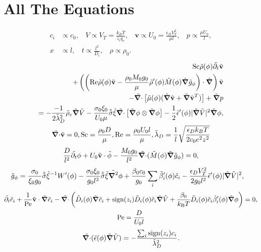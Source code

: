 \documentclass[a4paper,10pt]{article}
\renewcommand{\v}[1]{\mathbf{#1}}
\renewcommand{\v}[1]{\ensuremath{\mathbf{#1}}} %
\newcommand{\ti}[1]{\ensuremath{\tilde{#1}}} %
\newcommand{\gv}[1]{\ensuremath{\mbox{\boldmath$ #1 $}}}
\newcommand{\grad}[1]{\gv{\nabla} #1} %
\renewcommand{\div}[1]{\gv{\nabla} \cdot #1} %
\newcommand{\laplacian}[1]{\grad^2 #1}
\newcommand{\pdt}[1]{\partial_t #1}
\begin{document}
\section{All The Equations}
\begin{align}
c_i &\propto c_0, ~~~~ V \propto V_T = \frac{k_B T}{z_i q_e}, ~~~~\v{v} \propto U_0 = \frac{\epsilon_D V_T^2}{\mu l}, ~~~~p \propto \frac{\mu U_0}{l},\\
x &\propto l , ~~~~ t \propto \frac{l^2}{D_i}, ~~~~ \rho \propto \rho_0.
\end{align}
\begin{gather}
\begin{split}	
\mathrm{Sc} \ti{\rho}(\phi) \ti{\pdt{}} \ti{\v{v}}\\
+ \left( \left( \mathrm{Re} \ti\rho(\phi) \ti{\v{v}} - \frac{\rho_0 M_0 g_0}{\mu}\ti\rho'(\phi) \ti M(\phi) \ti{\grad{}} \ti g_\phi  \right) \cdot \ti{\grad{}} \right) \ti{\v{v}}\\
- \ti{\div{}} \left[\ti \mu(\phi)(\ti{\grad{}} \ti{\v{v}} + \ti{\grad{}} \ti{\v{v}} ^T) \right] + \ti{\grad{}} p \\
= - \frac{-1}{2\tilde{\lambda}_D^2} \ti \rho_e \ti{\grad{}} \ti{V} - \frac{\sigma_0 \xi_0 }{U_0 \mu}\hat{\ti{\sigma}} \ti \xi\ti{\div{}} \left[ \ti{\grad{}} \phi \otimes \ti{\grad{}} \phi \right] - \frac 1 2 \ti \epsilon'(\phi) | \ti{\grad{}} \ti V |^2 \ti{\grad{}} \phi,
\end{split}\\
\ti{\div{}} \ti{\v{v}} = 0, \mathrm{Sc} = \frac{\rho_0 D}{\mu},\mathrm{Re} = \frac{\rho_0 
	U_0 l}{\mu} ,\tilde{\lambda}_D = \frac{1}{l}\sqrt{\frac{\epsilon_D k_B T}{2 c_0 e^2 z^2}} 
\end{gather}
\begin{gather}
\frac{D}{l^2}\ti{\pdt{}} \phi + U_0\ti{\v v} \cdot \ti{\phi} - \frac{M_0 g_0 }{l^2}\ti{\div{}} (\ti{M}(\phi) \ti{\grad{}} \ti{g}_\phi ) = 0,
\end{gather}
\begin{align}
\tilde{g}_\phi &= \frac{\sigma_0}{\xi_0 g_0 }\hat{\ti{\sigma}}\ti{\xi}^{-1}W'(\phi) - \frac{\sigma_0 \xi_0}{g_0 l^2}\hat{\ti{\sigma}}\ti{\xi}\ti{\laplacian{}}\phi + \frac{\beta_0 c_0}{g_0}\sum_i \ti{\beta}_i'(\phi) \ti{c}_i - \frac{\epsilon_D V_T^2}{2 g_0 l^2} \ti{\epsilon}'(\phi) | \ti{\grad{}} \ti{V} |^2 ,
\end{align}
\begin{gather}
\ti{\pdt{}} \ti{c}_i + \frac{1}{\mathrm{Pe}}\ti{\v{v}} \cdot \ti{\grad{}} \ti{c}_i - \ti{\div{}} \left( \ti{D}_{i} (\phi) \ti{\grad{}} \ti{c}_i + \mathrm{sign}(z_i)\ti{D}_i(\phi)\ti{c}_i \ti{\grad{}} \ti{V} +\frac{ \beta_0}{k_{\rm B} T }\ti{D}_i(\phi)\ti{c}_i\ti{\beta}_i'(\phi) \ti{\grad{}} \phi \right) = 0,\\ 
\mathrm{Pe} = \frac{D}{U_0 l }
\end{gather}
\begin{gather}
\ti{\div{}} ( \ti{\epsilon} (\phi) \ti{\grad{}} \ti{V} ) = - \frac{\sum_i \mathrm{sign}(z_i) c_i}{\ti{\lambda}_D^2}.
\end{gather}
\newpage
\end{document}
